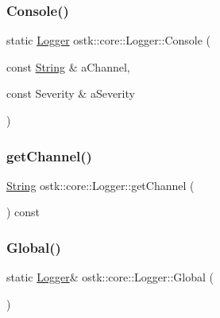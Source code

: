 \mbox{\label{classostk_1_1core_1_1_logger_a37f1934e129df80b75bffa2cf7255ff0}} 
\subsubsection{\texorpdfstring{Console()}{Console()}\hspace{0.1cm}{\footnotesize\ttfamily [2/2]}}
{\footnotesize\ttfamily static \hyperlink{classostk_1_1core_1_1_logger}{Logger} ostk\+::core\+::\+Logger\+::\+Console (\begin{DoxyParamCaption}\item[{const \hyperlink{classostk_1_1core_1_1types_1_1_string}{String} \&}]{a\+Channel,  }\item[{const Severity \&}]{a\+Severity }\end{DoxyParamCaption})\hspace{0.3cm}{\ttfamily [static]}}

\mbox{\label{classostk_1_1core_1_1_logger_a4691c53452220b6830fa566ce1c15605}} 
\subsubsection{\texorpdfstring{get\+Channel()}{getChannel()}}
{\footnotesize\ttfamily \hyperlink{classostk_1_1core_1_1types_1_1_string}{String} ostk\+::core\+::\+Logger\+::get\+Channel (\begin{DoxyParamCaption}{ }\end{DoxyParamCaption}) const}

\mbox{\label{classostk_1_1core_1_1_logger_a183e8665ded1dcadb11ed138879f034b}} 
\subsubsection{\texorpdfstring{Global()}{Global()}}
{\footnotesize\ttfamily static \hyperlink{classostk_1_1core_1_1_logger}{Logger}\& ostk\+::core\+::\+Logger\+::\+Global (\begin{DoxyParamCaption}{ }\end{DoxyParamCaption})\hspace{0.3cm}{\ttfamily [static]}}

